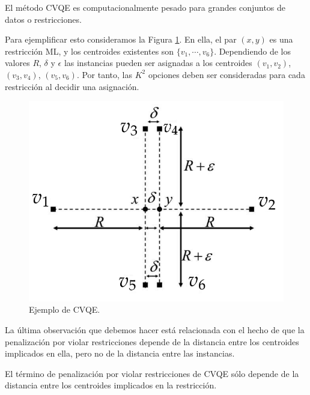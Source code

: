 \begin{observacion}
	
	El método \acs{CVQE} es computacionalmente pesado para grandes conjuntos de datos o restricciones.
	
\end{observacion}

Para ejemplificar esto consideramos la Figura \ref{fig:figure19}. En ella, el par $(x,y)$ es una restricción \acs{ML}, y los centroides existentes son $\{v_1,\cdots,v_6\}$. Dependiendo de los valores $R$, $\delta$ y $\epsilon$ las instancias pueden ser asignadas a los centroides $(v_1, v_2)$, $(v_3, v_4)$, $(v_5, v_6)$. Por tanto, las $K^2$ opciones deben ser consideradas para cada restricción al decidir una asignación.

\begin{figure}[!h]
	\centering
	\includegraphics[scale=0.3]{imagenes/c4/Fig1}
	\caption[Ejemplo de CVQE.]{Ejemplo de CVQE. \cite{LCVQE:2007}}\label{fig:figure19}
\end{figure}

La última observación que debemos hacer está relacionada con el hecho de que la penalización por violar restricciones depende de la distancia entre los centroides implicados en ella, pero no de la distancia entre las instancias. 

\begin{observacion}
	
	El término de penalización por violar restricciones de \acs{CVQE} sólo depende de la distancia entre los centroides implicados en la restricción.
	
\end{observacion}


